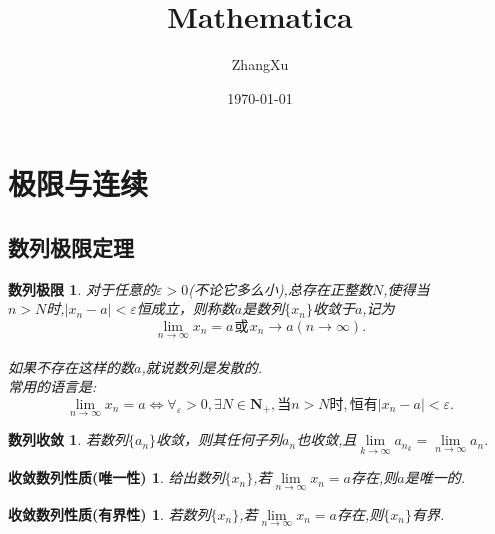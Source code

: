 \documentclass[10pt,a4paper,UTF8]{ctexart}
\title{Mathematica}
\author{ZhangXu}
\date{\today}
\begin{document}
\maketitle

\section{极限与连续}
\setcounter{theoremcounter}{1}
\subsection{数列极限定理}
\newtheorem{theorem1}{数列极限}[theoremcounter]
\begin{theorem1}
对于任意的$\varepsilon>0$(不论它多么小),总存在正整数$N$,使得当
\\$n>N$时,$|x_n-a|<\varepsilon$恒成立，则称数$a$是数列$\{x_n\}$收敛于$a$,记为\\
\[ \lim_{n\rightarrow\infty}{x_n=a} \hspace{1pt}\textit{或}\hspace{1pt} x_n\rightarrow a(n\rightarrow \infty). \]
\\%
如果不存在这样的数$a$,就说数列是发散的.\\
常用的语言是:\[\lim_{n\rightarrow\infty}{x_n=a}\Leftrightarrow \forall_\varepsilon > 0,\exists N\in \bm{N}_+,\textit{当}n>N\textit{时},\textit{恒有}|x_n - a|<\varepsilon. \]
\end{theorem1}

\addtocounter{theoremcounter}{1}
\newtheorem{theorem2}{数列收敛}[theoremcounter]
\begin{theorem2}
若数列$\{a_n\}$收敛，则其任何子列${a_n}$也收敛,且$\lim\limits_{k\to\infty}{a_{n_k}} = \lim\limits_{n\rightarrow\infty}{a_n}.$ %
\end{theorem2}

\addtocounter{theoremcounter}{1}
\newtheorem{theorem3}{收敛数列性质(唯一性)}[theoremcounter]
\begin{theorem3}
给出数列$\{x_n\}$,若$\lim\limits_{n\to\infty}{x_n}=a$存在,则$a$是唯一的.
\end{theorem3}

\addtocounter{theoremcounter}{1}
\newtheorem{theorem4}{收敛数列性质(有界性)}[theoremcounter]
\begin{theorem4}
若数列$\{x_n\}$,若$\lim\limits_{n\to\infty}{x_n}=a$存在,则$\{x_n\}$有界.
\end{theorem4}
\end{document}
